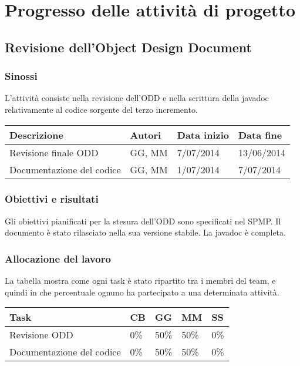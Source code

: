 \chapter{Progresso delle attività di progetto}
\section{Revisione dell'Object Design Document}
\subsection{Sinossi}
L'attività consiste nella revisione dell'ODD e nella scrittura della javadoc relativamente al codice sorgente del terzo incremento.

\begin{table}[ht]
 \begin{tabular}{|p{6cm}|p{2cm}|p{2cm}|p{2cm}|}
    \hline
    \rowcolor{Gray}\textbf{Descrizione}			& \textbf{Autori}		& \textbf{Data inizio}			& \textbf{Data fine}	\\
    \hline
    Revisione finale ODD				& GG, MM			& 7/07/2014				& 13/06/2014		\\
    \hline
    Documentazione del codice				& GG, MM			& 1/07/2014				& 7/07/2014		\\
    \hline
 \end{tabular}
\end{table}

\subsection{Obiettivi e risultati}
Gli obiettivi pianificati per la stesura dell'ODD sono specificati nel SPMP. Il documento è stato rilasciato nella sua versione stabile. La javadoc è completa.

\subsection{Allocazione del lavoro}
La tabella mostra come ogni task è stato ripartito tra i membri del team, e quindi in che percentuale ognuno ha partecipato a una determinata attività.
\begin{table}[ht]
 \begin{tabular}{|p{7.5cm}|p{1cm}|p{1cm}|p{1cm}|p{1cm}|}
  \hline
  \rowcolor{Gray}\textbf{Task}			& \textbf{CB}		& \textbf{GG}		& \textbf{MM}		& \textbf{SS}		\\
  \hline
  Revisione ODD					& 0\%			& 50\%			& 50\%			& 0\%			\\
  \hline
  Documentazione del codice			& 0\%			& 50\%			& 50\%			& 0\%			\\
  \hline
 \end{tabular}
\end{table}

